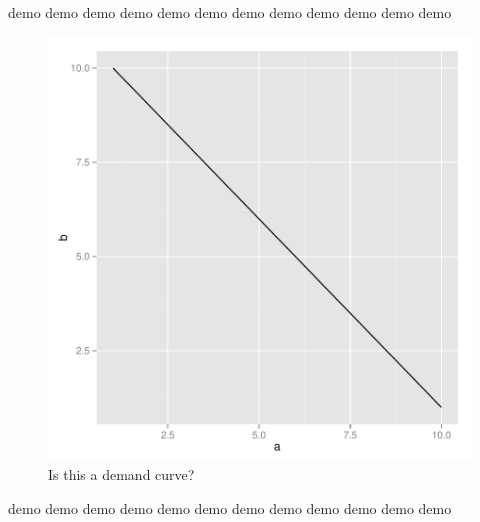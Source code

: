 \documentclass{report}
\begin{document}


demo demo demo demo demo demo demo demo demo demo demo demo 

\begin{figure}[h]
 \begin{center}
\includegraphics{sweave-001}
  \caption{Is this a demand curve?}
 \end{center}
\end{figure}

demo demo demo demo demo demo demo demo demo demo demo demo 
\end{document}
